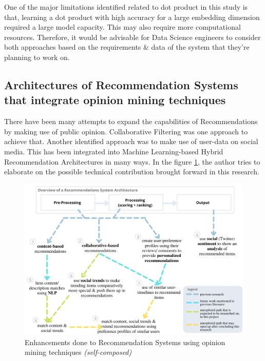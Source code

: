 One of the major limitations identified related to dot product in this study is that, learning a dot product with high accuracy for a large embedding dimension required a large model capacity. This may also require more computational resources. Therefore, it would be advisable for Data Science engineers to consider both approaches based on the requirements \& data of the system that they're planning to work on.


\subsection{Architectures of Recommendation Systems that integrate opinion mining techniques}
There have been many attempts to expand the capabilities of Recommendations by making use of public opinion. Collaborative Filtering was one approach to achieve that. Another identified approach was to make use of user-data on social media. This has been integrated into Machine Learning-based Hybrid Recommendation Architectures in many ways. In the figure \ref{fig:recommendation-opinion-mining-enhancements}, the author tries to elaborate on the possible technical contribution brought forward in this research.

\begin{figure}[h!]
\centering
\includegraphics[width=\textwidth]{images/LR/Enhanced Recommendation Systems.png}
\caption{Enhancements done to Recommendation Systems using opinion mining techniques \textit{(self-composed)}}
\label{fig:recommendation-opinion-mining-enhancements}
\end{figure}

